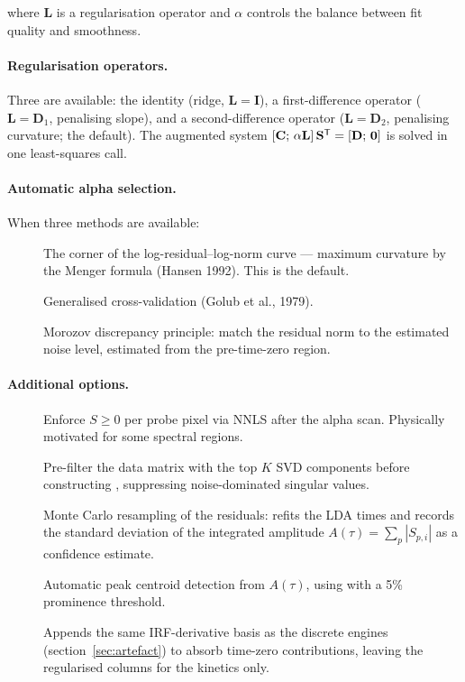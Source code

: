 where $\mathbf{L}$ is a regularisation operator and $\alpha$ controls the
balance between fit quality and smoothness.

\paragraph{Regularisation operators.} Three are available: the identity
(ridge, $\mathbf{L} = \mathbf{I}$), a first-difference operator ($\mathbf{L} =
\mathbf{D}_1$, penalising slope), and a second-difference operator ($\mathbf{L}
= \mathbf{D}_2$, penalising curvature; the default). The augmented system
$[\mathbf{C};\,\alpha\mathbf{L}]\,\mathbf{S}^{\mathsf{T}} = [\mathbf{D};\,\mathbf{0}]$ is
solved in one least-squares call.

\paragraph{Automatic alpha selection.} When  three
methods are available:
\begin{description}
  \item[] The corner of the log-residual--log-norm curve ---
    maximum curvature by the Menger formula (Hansen 1992). This is the default.
  \item[] Generalised cross-validation (Golub et al., 1979).
  \item[] Morozov discrepancy principle: match the residual norm
    to the estimated noise level, estimated from the pre-time-zero region.
\end{description}

\paragraph{Additional options.}
\begin{description}
  \item[] Enforce $S \ge 0$ per probe pixel via NNLS
    after the alpha scan. Physically motivated for some spectral regions.
  \item[] Pre-filter the data matrix with the top $K$
    SVD components before constructing \Cmat, suppressing noise-dominated
    singular values.
  \item[] Monte Carlo resampling of the residuals:
    refits the LDA  times and records the standard
    deviation of the integrated amplitude $A(\tau) = \sum_p |S_{p,i}|$ as a
    confidence estimate.
  \item[] Automatic peak centroid detection from
    $A(\tau)$, using  with a 5\% prominence
    threshold.
  \item[] Appends the same IRF-derivative basis as
    the discrete engines (section~\ref{sec:artefact}) to absorb time-zero
    contributions, leaving the regularised columns for the kinetics only.
\end{description}

